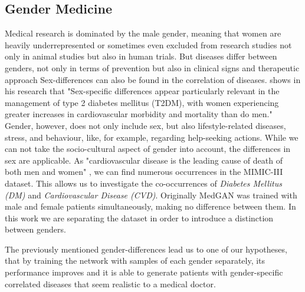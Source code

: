 \documentclass[11pt, a4paper]{book}
\begin{document}
\subsection{Gender Medicine}
Medical research is dominated by the male gender, meaning that women are heavily underrepresented or sometimes even excluded from research studies not only in animal studies but also in human trials. \cite{baggio2013gender} 
But diseases differ between genders, not only in terms of prevention but also in clinical signs and therapeutic approach  \cite{baggio2013gender}
Sex-differences can also be found in the correlation of diseases. \cite{kautzky2010sex} shows in his research that "Sex-specific differences appear particularly relevant in the management of type 2 diabetes mellitus (T2DM), with women experiencing greater increases in cardiovascular morbidity and mortality than do men." \cite{kautzky2010sex}
Gender, however, does not only include sex, but also lifestyle-related diseases, stress, and behaviour, like, for example, regarding help-seeking actions.
While we can not take the socio-cultural aspect of gender into account, the differences in sex are applicable.
As "cardiovascular disease is the leading cause of death of both men and women" \cite{arain2009sex}, we can find numerous occurrences in the MIMIC-III dataset. This allows us to investigate the co-occurrences of \textit{Diabetes Mellitus (DM)} and \textit{Cardiovascular Disease (CVD)}.
Originally MedGAN was trained with male and female patients simultaneously, making no difference between them. In this work we are separating the dataset in order to introduce a distinction between genders.

The previously mentioned gender-differences lead us to one of our hypotheses, that by training the network with samples of each gender separately, its performance improves and it is able to generate patients with gender-specific correlated diseases that seem realistic to a medical doctor.
\end{document}
